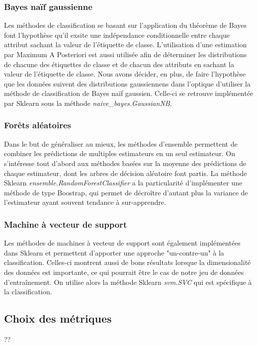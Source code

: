 \subsubsection*{Bayes naïf gaussienne}
Les méthodes de classification se basant sur l'application du théorème de Bayes font l'hypothèse qu'il exsite une indépendance conditionnelle entre chaque attribut sachant la valeur de l'étiquette de classe. L'utilisation d'une estimation par Maximum A Posteriori est aussi utilisée afin de déterminer les distributions de chacune des étiquettes de classe et de chacun des attributs en sachant la valeur de l'étiquette de classe. Nous avons décider, en plus, de faire l'hypothèse que les données suivent des distributions gaussiennens dans l'optique d'utiliser la méthode de classification de Bayes naïf gaussien. Celle-ci se retrouve implémentée par Sklearn sous la méthode \emph{naive\_bayes.GaussianNB}.

\subsubsection*{Forêts aléatoires}
Dans le but de généraliser au mieux, les méthodes d'ensemble permettent de combiner les prédictions de multiples estimateurs en un seul estimateur. On s'intéresse tout d'abord aux méthodes basées sur la moyenne des prédictions de chaque estimateur, dont les arbres de décision aléatoire font partis. 
La méthode Sklearn \emph{ensemble.RandomForestClassifier} a la particularité d'implémenter une méthode de type Boostrap, qui permet de décroître d'autant plus la variance de l'estimateur ayant souvent tendance à sur-apprendre.

\subsubsection*{Machine à vecteur de support}
Les méthodes de machines à vecteur de support sont également implémentées dans Sklearn et permettent d'apporter une approche "un-contre-un" à la classification. Celles-ci montrent aussi de bons résultats lorsque la dimensionalité des données est importante, ce qui pourrait être le cas de notre jeu de données d'entraînement. On utilise alors la méthode Sklearn \emph{svm.SVC} qui est spécifique à la classification.

\subsection{Choix des métriques}
??
